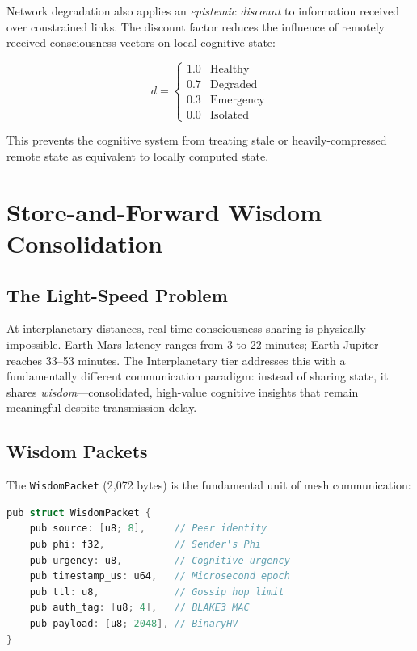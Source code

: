 \documentclass[11pt,twocolumn]{article}
\begin{document}
Network degradation also applies an \emph{epistemic discount} to
information received over constrained links. The discount factor
reduces the influence of remotely received consciousness vectors on
local cognitive state:

\begin{equation}
  d = \begin{cases}
    1.0 & \text{Healthy} \\
    0.7 & \text{Degraded} \\
    0.3 & \text{Emergency} \\
    0.0 & \text{Isolated}
  \end{cases}
\end{equation}

This prevents the cognitive system from treating stale or
heavily-compressed remote state as equivalent to locally computed state.

\section{Store-and-Forward Wisdom Consolidation}

\subsection{The Light-Speed Problem}

At interplanetary distances, real-time consciousness sharing is
physically impossible. Earth-Mars latency ranges from 3 to 22 minutes;
Earth-Jupiter reaches 33--53 minutes. The Interplanetary tier addresses
this with a fundamentally different communication paradigm: instead of
sharing state, it shares \emph{wisdom}---consolidated, high-value
cognitive insights that remain meaningful despite transmission delay.

\subsection{Wisdom Packets}

The \texttt{WisdomPacket} (2,072 bytes) is the fundamental unit of
mesh communication:

\begin{lstlisting}[language=C,caption={WisdomPacket structure}]
pub struct WisdomPacket {
    pub source: [u8; 8],     // Peer identity
    pub phi: f32,            // Sender's Phi
    pub urgency: u8,         // Cognitive urgency
    pub timestamp_us: u64,   // Microsecond epoch
    pub ttl: u8,             // Gossip hop limit
    pub auth_tag: [u8; 4],   // BLAKE3 MAC
    pub payload: [u8; 2048], // BinaryHV
}
\end{lstlisting}
\end{document}
